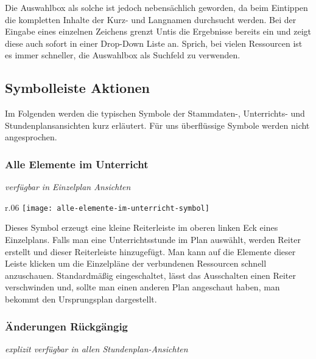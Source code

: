 \noindent
Die Auswahlbox als solche ist jedoch nebensächlich geworden, da beim Eintippen die kompletten Inhalte der Kurz- und Langnamen durchsucht werden. Bei der Eingabe eines einzelnen Zeichens grenzt Untis die Ergebnisse bereits ein und zeigt diese auch sofort in einer Drop-Down Liste an. Sprich, bei vielen Ressourcen ist es immer schneller, die Auswahlbox als Suchfeld zu verwenden. 

\subsection{Symbolleiste Aktionen}

Im Folgenden werden die typischen Symbole der Stammdaten-, Unterrichts- und Stundenplansansichten kurz erläutert. Für uns überflüssige Symbole werden nicht angesprochen.\\

\subsubsection{Alle Elemente im Unterricht}
{\small\textit{verfügbar in Einzelplan Ansichten\\}\par}

\begin{wrapfigure}{r}{.06\textwidth}
	\vspace{-50pt}
	\texttt{[image: alle-elemente-im-unterricht-symbol]}
	\vspace{-35pt}
\end{wrapfigure}

\noindent
Dieses Symbol erzeugt eine kleine Reiterleiste im oberen linken Eck eines Einzelplans. Falls man eine Unterrichtsstunde im Plan auswählt, werden Reiter erstellt und dieser Reiterleiste hinzugefügt. Man kann auf die Elemente dieser Leiste klicken um die Einzelpläne der verbundenen Ressourcen schnell anzuschauen. Standardmäßig eingeschaltet, lässt das Ausschalten einen Reiter verschwinden und, sollte man einen anderen Plan angeschaut haben, man bekommt den Ursprungsplan dargestellt.\\

\subsubsection{Änderungen Rückgängig}
{\small\textit{explizit verfügbar in allen Stundenplan-Ansichten\\}\par}

